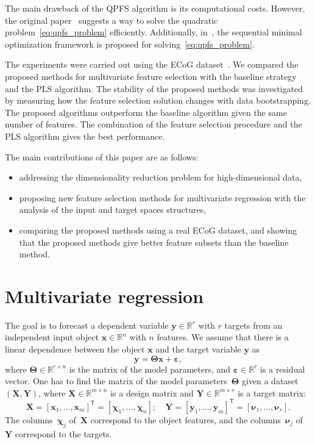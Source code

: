 \documentclass[12pt,twoside]{article}
\theoremstyle{definition}
\newcommand{\bx}{\mathbf{x}}
\newcommand{\by}{\mathbf{y}}
\newcommand{\bY}{\mathbf{Y}}
\newcommand{\bX}{\mathbf{X}}
\newcommand{\bbR}{\mathbb{R}}
\newcommand{\T}{\mathsf{T}}
\newcommand{\bchi}{\boldsymbol{\chi}}
\newcommand{\bnu}{\boldsymbol{\nu}}
\newcommand{\bTheta}{\boldsymbol{\Theta}}
\begin{document}
The main drawback of the QPFS algorithm is its computational costs. However, the original paper~\cite{rodriguez2010quadratic} suggests a way to solve the quadratic problem~\eqref{eq:qpfs_problem} efficiently. Additionally, in~\cite{prasad2013scaling}, the sequential minimal optimization framework is proposed for solving~\eqref{eq:qpfs_problem}.

The experiments were carried out using the ECoG dataset~\cite{shimoda2012decoding}.
We compared the proposed methods for multivariate feature selection with the baseline strategy and the PLS algorithm. 
The stability of the proposed methods was investigated by measuring how the feature selection solution changes with data bootstrapping.
The proposed algorithms outperform the baseline algorithm given the same number of features. 
The combination of the feature selection procedure and the PLS algorithm gives the best performance.

The main contributions of this paper are as follows:
\begin{itemize}
	\item addressing the dimensionality reduction problem for high-dimensional data,
	\item proposing new feature selection methods for multivariate regression with the analysis of the input and target spaces structures,
	\item comparing the proposed methods using a real ECoG dataset, and showing that the proposed methods give better feature subsets than the baseline method.
\end{itemize}

\section{Multivariate regression}

The goal is to forecast a dependent variable $\by \in \bbR^r$ with $r$ targets from an independent input object $\bx \in \bbR^n$ with $n$ features.
We assume that there is a linear dependence between the object $\bx$ and the target variable $\by$ as
\begin{equation}
\by = \bTheta \bx+ \boldsymbol{\varepsilon},
\label{eq:model}
\end{equation}
where $\bTheta \in \bbR^{r \times n}$ is the matrix of the model parameters, and $\boldsymbol{\varepsilon} \in \bbR^{r}$ is a residual vector.
One has to find the matrix of the model parameters~$\bTheta$ given a dataset $\left( \bX, \bY \right)$, where $\bX \in \bbR^{m \times n}$ is a design matrix and $\bY \in \bbR^{m \times r}$ is a target matrix:
\begin{equation*}
\bX = [\bx_1, \dots, \bx_m]^{\T} =  [\bchi_1, \dots, \bchi_n]; \quad \bY = [\by_1, \dots, \by_m]^{\T} =  [\bnu_1, \dots, \bnu_r].
\end{equation*}
The columns~$\bchi_j$ of~$\bX$ correspond to the object features, and the columns~$\bnu_j$ of~$\bY$ correspond to the targets.
\end{document}
